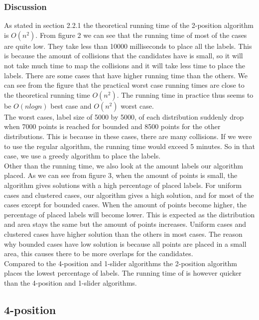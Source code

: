 \documentclass[crop=false,a4paper,oneside,11pt]{standalone}
\begin{document}
\subsubsection{Discussion}
As stated in section 2.2.1 the theoretical running time of the 2-position algorithm is $O(n^2)$. From figure 2 we can see that the running time of most of the cases are quite low. They take less than 10000 milliseconds to place all the labels. This is because the amount of collisions that the candidates have is small, so it will not take much time to map the collisions and it will take less time to place the labels. There are some cases that have higher running time than the others. We can see from the figure that the practical worst case running times are close to the theoretical running time $O(n^2)$. The running time in practice thus seems to be $O(nlogn)$ best case and $O(n^2)$ worst case.\\
The worst cases, label size of 5000 by 5000, of each distribution suddenly drop when 7000 points is reached for bounded and 8500 points for the other distributions. This is because in these cases, there are many collisions. If we were to use the regular algorithm, the running time would exceed 5 minutes. So in that case, we use a greedy algorithm to place the labels.\\
Other than the running time, we also look at the amount labels our algorithm placed. As we can see from figure 3, when the amount of points is small, the algorithm gives solutions with a high percentage of placed labels. For uniform cases and clustered cases, our algorithm gives a high solution, and for most of the cases except for bounded cases. When the amount of points become higher, the percentage of placed labels will become lower. This is expected as the distribution and area stays the same but the amount of points increases. Uniform cases and clustered cases have higher solution than the others in most cases. The reason why bounded cases have low solution is because all points are placed in a small area, this causes there to be more overlaps for the candidates.\\
Compared to the 4-position and 1-slider algorithms the 2-position algorithm places the lowest percentage of labels. The running time of is however quicker than the 4-position and 1-slider algorithms. 


\subsection{4-position}
\end{document}

